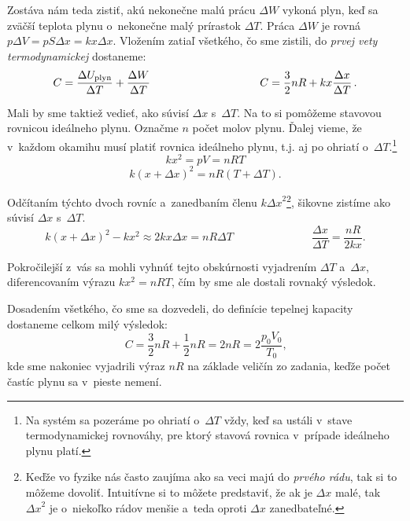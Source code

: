 Zostáva nám teda zistiť, akú nekonečne malú prácu $\Delta W$ vykoná plyn, keď sa zväčší teplota plynu o~nekonečne malý 
prírastok $\Delta T$. Práca $\Delta W$ je rovná $p\Delta V = pS\Delta x = kx\Delta x$. Vložením zatiaľ všetkého, čo sme zistili, do 
\emph{prvej vety termodynamickej} dostaneme:
$$C = \frac{\Delta U_{\text{plyn}}}{\Delta T} + \frac{\Delta W}{\Delta T} \hspace{3.5cm}
C = \frac{3}{2}nR + kx\frac{\Delta x}{\Delta T} \,\text{.}$$

Mali by sme taktiež vedieť, ako súvisí $\Delta x$ s~$\Delta T$. Na to si pomôžeme stavovou rovnicou ideálneho plynu. Označme $n$ počet 
molov plynu. Ďalej vieme, že v~každom okamihu musí platiť rovnica ideálneho plynu, t.j. aj po ohriatí o~$\Delta T$.\footnote{Na 
systém sa pozeráme po ohriatí o~$\Delta T$ vždy, keď sa ustáli v~stave termodynamickej rovnováhy, pre ktorý stavová rovnica
v~prípade ideálneho plynu platí.}
$$kx^2  = pV = nRT $$
$$k{\left(x+\Delta x\right)}^2 = nR\left(T+\Delta T\right)\text{.}$$

Odčítaním týchto dvoch rovníc a~zanedbaním členu $k{\Delta x}^2$\footnote{Keďže vo fyzike nás často zaujíma ako sa veci majú 
do \emph{prvého rádu}, tak si to môžeme dovoliť. Intuitívne si to môžete predstaviť, že ak je $\Delta x$ malé, tak ${\Delta x}^2$ 
je o~niekoľko rádov menšie a~teda oproti $\Delta x$ zanedbateľné.}, šikovne zistíme ako súvisí $\Delta x$ s~$\Delta T$.
$$k{\left(x+\Delta x\right)}^2 - kx^2 \approx 2kx\Delta x = nR\Delta T \hspace{3cm}
\frac{\Delta x}{\Delta T} = \frac{nR}{2kx}\text{.}$$

Pokročilejší z~vás sa mohli vyhnúť tejto obskúrnosti vyjadrením $\Delta T$ a~$\Delta x$, diferencovaním výrazu $kx^2 = nRT$,
čím by sme ale dostali rovnaký výsledok.

Dosadením všetkého, čo sme sa dozvedeli, do definície tepelnej kapacity dostaneme celkom milý výsledok:
$$C = \frac{3}{2}nR + \frac{1}{2}nR = 2nR = 2\frac{p_0 V_0}{T_0} \text{,}$$
kde sme nakoniec vyjadrili výraz $nR$ na základe veličín zo zadania, keďže počet častíc plynu sa v~pieste nemení.
